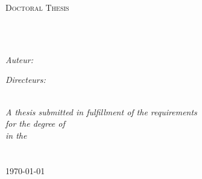 




\frontmatter %

\pagestyle{plain} %


\begin{titlepage}
\begin{center}

{\scshape\LARGE \univname\par}\vspace{1.5cm} %
\textsc{\Large Doctoral Thesis}\\[0.5cm] %

\HRule \\[0.4cm] %
{\huge \bfseries \ttitle\par}\vspace{0.4cm} %
\HRule \\[1.5cm] %
 
\begin{minipage}[t]{0.4\textwidth}
\begin{flushleft} \large
\emph{Auteur:}\\
\href{http://www.johnsmith.com}{\authorname} %
\end{flushleft}
\end{minipage}
\begin{minipage}[t]{0.4\textwidth}
\begin{flushright} \large
\emph{Directeurs:} \\
\href{http://www.jamessmith.com}{\supname} %
\end{flushright}
\end{minipage}\\[3cm]
 
\large \textit{A thesis submitted in fulfillment of the requirements\\ for the degree of \degreename}\\[0.3cm] %
\textit{in the}\\[0.4cm]
\groupname\\\deptname\\[2cm] %
 
{\large \today}\\[4cm] %
 
\vfill
\end{center}
\end{titlepage}


